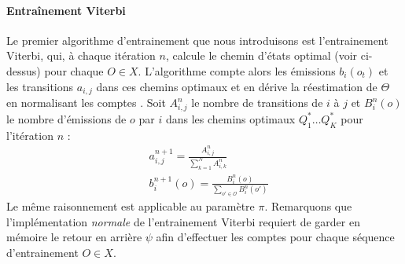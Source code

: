 \documentclass[letterpaper]{article}
\begin{document}
\paragraph{Entraînement Viterbi}
Le premier algorithme d'entrainement que nous introduisons est l'entrainement Viterbi, qui, à chaque itération $n$, calcule le chemin d'états optimal (voir ci-dessus) pour chaque $O \in X$. L'algorithme compte alors les émissions $b_i(o_t)$ et les transitions $a_{i,j}$ dans ces chemins optimaux et en dérive la réestimation de $\Theta$ en normalisant les comptes \citep{LM}. Soit $A_{i,j}^{n}$ le nombre de transitions de $i$ à $j$ et $B_i^n(o)$ le nombre d'émissions de $o$ par $i$ dans les chemins optimaux $Q_1^*\dots Q_K^*$ pour l'itération $n$ :
\begin{equation} \label{eq:viterbi_training}
\begin{aligned}
	& a_{i,j}^{n+1} = \frac{A_{i,j}^n}{\sum_{k=1}^{N} A_{i,k}^n} \\
	& b_i^{n+1}(o) = \frac{B_i^n(o)}{\sum_{o' \in \mathcal{O}} B_i^n(o')} 
\end{aligned}
\end{equation}
Le même raisonnement est applicable au paramètre $\pi$. Remarquons que l'implémentation \textit{normale} de l'entrainement Viterbi requiert de garder en mémoire le retour en arrière $\psi$ afin d'effectuer les comptes pour chaque séquence d'entrainement $O \in X$.

\end{document}
